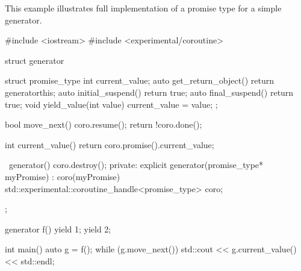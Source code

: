 \enterexample
This example illustrates full implementation
of a promise type for a simple generator.
\begin{codeblock}
  #include <iostream>
  #include <experimental/coroutine>
  
  struct generator {
    struct promise_type {
      int current_value;
      auto get_return_object() { return generator{this}; }
      auto initial_suspend() { return true; }
      auto final_suspend() { return true; }
      void yield_value(int value) { current_value = value; }
    };
    
    bool move_next() {
      coro.resume();
      return !coro.done();
    }
    
    int current_value() { return coro.promise().current_value; }
    
    ~generator() { coro.destroy(); }
  private:
    explicit generator(promise_type* myPromise) : coro(myPromise) 
    {
    }
    std::experimental::coroutine_handle<promise_type> coro;
  };
  
  generator f() {
    yield 1;
    yield 2;
  } 
  
  int main() {
    auto g = f();
    while (g.move_next()) std::cout << g.current_value() << std::endl;
  }
  
\end{codeblock}
\exitexample